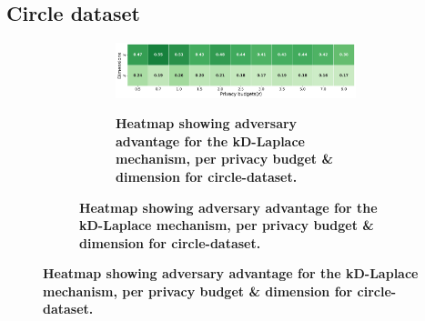 \subsection{Circle dataset}
\begin{figure}[H]
    \centering
    \begin{subfigure}[b]{0.85\textwidth}
        \begin{subfigure}[c]{1\textwidth}
            \caption{\textbf{Heatmap showing adversary advantage for the kD-Laplace mechanism, per privacy budget \& dimension for circle-dataset.}}
            \includegraphics[width=1\textwidth]{Results/kd-laplace/kd-Laplace/circle-dataset/shokri_mi_adv.png}
            \label{fig:privacy_circle-dataset_adversial_advantage_kd-laplace}
        \end{subfigure}
        \vfill %


\end{subfigure}
\end{figure}
